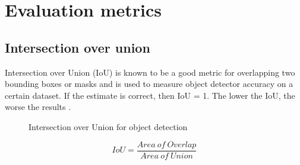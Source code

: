 \section{Evaluation metrics}
\subsection{Intersection over union}
Intersection over Union (IoU) is known to be a good metric for overlapping two bounding boxes or masks and is used to measure object detector accuracy on a certain dataset. If the estimate is correct, then IoU = 1. The lower the IoU, the worse the results \cite{sheremet_intersection_2020}.

\begin{figure}[h]
    \centering
    \hfill
    \caption{Intersection over Union for object detection \cite{rosebrock_intersection_2016}}
    \label{figure: iou}
\end{figure}

\begin{equation}
    IoU = \frac{Area\ of\ Overlap}{Area\ of\ Union} \label{eq: ioueq}
\end{equation}
\vspace{0.5cm}

